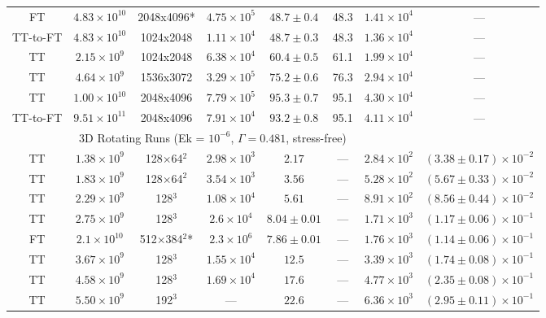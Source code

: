 \documentclass[aps, pre, onecolumn, nofootinbib, notitlepage, groupedaddress, amsfonts, amssymb, amsmath, longbibliography, superscriptaddress]{revtex4-1}
\begin{document}
\begin{table}[ht]
\begin{center}
\begin{tabularx}{\textwidth}{c c c c c c c c}
FT			&	$4.83 \times 10^{10}$	&	2048x4096*	&	$4.75 \times 10^5$	&	$48.7 \pm 0.4$	&	48.3	&	$1.41 \times 10^4$ & --- \\
TT-to-FT	&	$4.83 \times 10^{10}$	&	1024x2048	&	$1.11 \times 10^4$	&	$48.7 \pm 0.3$	&	48.3	&	$1.36 \times 10^4$ & --- \\
TT			&	$2.15 \times 10^9$		&	1024x2048	&	$6.38 \times 10^4$	&	$60.4 \pm 0.5$	&	61.1	&	$1.99 \times 10^4$ & --- \\
TT			&	$4.64 \times 10^9$		&	1536x3072	&	$3.29 \times 10^5$	&	$75.2 \pm 0.6$	&	76.3	&	$2.94 \times 10^4$ & --- \\
TT			&	$1.00 \times 10^{10}$	&	2048x4096	&	$7.79 \times 10^5$	&	$95.3 \pm 0.7$	&	95.1	&	$4.30 \times 10^4$ & --- \\
TT-to-FT	&	$9.51 \times 10^{11}$	&	2048x4096	&	$7.91 \times 10^4$	& 	$93.2 \pm 0.8$ 	&	95.1	&	$4.11 \times 10^4$ & --- \\
\hline																	
\multicolumn{7}{c}{\vspace{0.1cm}3D Rotating Runs (Ek = $10^{-6}$, $\Gamma = 0.481$, stress-free)} \\
\hline																	
TT	&	$1.38 \times 10^9$		&	128$\times$64$^2$	&	$2.98 \times 10^3$	&	$2.17$			&	---		&	$2.84 \times 10^2$  & $(3.38 \pm 0.17) \times 10^{-2}$ \\
TT	&	$1.83 \times 10^9$		&	128$\times$64$^2$	&	$3.54 \times 10^3$	&	$3.56$			&	---		&	$5.28 \times 10^2$  & $(5.67 \pm 0.33) \times 10^{-2}$ \\
TT	&	$2.29 \times 10^9$		&	128$^3$				&	$1.08 \times 10^4$	&	$5.61$			&	---		&	$8.91 \times 10^2$  & $(8.56 \pm 0.44) \times 10^{-2}$ \\
TT	&	$2.75 \times 10^9$		&	128$^3$				&	$2.6 \times 10^4$	&	$8.04 \pm 0.01$	&	---		&	$1.71 \times 10^3$  & $(1.17 \pm 0.06) \times 10^{-1}$ \\
FT	&	$2.1 \times 10^{10}$	&	512$\times$384$^2$*	&	$2.3 \times 10^6$	&	$7.86 \pm 0.01$	&	---		&	$1.76 \times 10^3$  & $(1.14 \pm 0.06) \times 10^{-1}$ \\
TT	&	$3.67 \times 10^9$		&	128$^3$				&	$1.55 \times 10^4$	&	$12.5$			&	---		&	$3.39 \times 10^3$  & $(1.74 \pm 0.08) \times 10^{-1}$ \\
TT	&	$4.58 \times 10^9$		&	128$^3$				&	$1.69 \times 10^4$	&	$17.6$			&	---		&	$4.77 \times 10^3$  & $(2.35 \pm 0.08) \times 10^{-1}$ \\
TT	&	$5.50 \times 10^9$		&	192$^3$				&	---					&	$22.6$			&	---		&	$6.36 \times 10^3$  & $(2.95 \pm 0.11) \times 10^{-1}$ \\

\end{tabularx}
\end{center}
\end{table}
\end{document}
